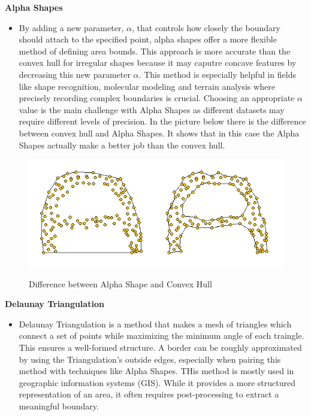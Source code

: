     \textbf{Alpha Shapes}
    \begin{itemize}
        \item By adding a new parameter, $\alpha$, that controls how closely the boundary should attach to the specified point, alpha shapes offer a more flexible method of defining area bounds. This approach is more accurate than the convex hull for irregular shapes because it may caputre concave features by decreasing this new parameter $\alpha$. This method is especially helpful in fields like shape recognition, molecular modeling and terrain analysis where precisely recording complex boundaries is crucial. Choosing an appropriate $\alpha$ value is the main challenge with Alpha Shapes as different datasets may require different levels of precision. In the picture below there is the difference between convex hull and Alpha Shapes. It shows that in this case the Alpha Shapes actually make a better job than the convex hull. \autocite{Andi:alphaShape}
    \end{itemize} 

    \begin{figure} [H]
        \centering
        \includegraphics [width=.75\textwidth] {images/andreas/areaBorders/alphaShapePic.png}
        \caption{Difference between Alpha Shape and Convex Hull}
        \cite{Andi:alphaShapePic}
    \end{figure}

    \textbf{Delaunay Triangulation}
    \begin{itemize}
        \item Delaunay Triangulation is a method that makes a mesh of triangles which connect a set of points while maximizing the minimum angle of each traingle. This ensures a well-formed structure. A border can be roughly approximated by using the Triangulation's outside edges, especially when pairing this method with techniques like Alpha Shapes. THis method is mostly used in geographic information systems (GIS). While it provides a more structured representation of an area, it often requires post-processing to extract a meaningful boundary.
    \end{itemize} \autocite{Andi:DT}

